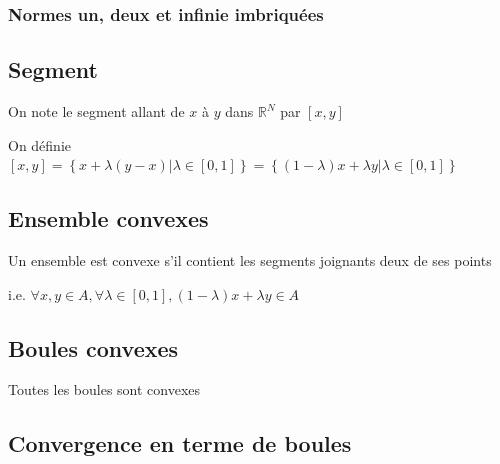 \documentclass[a4paper,10pt]{article}
\newcommand{\R}{\mathbb{R}}
\begin{document}
\subsubsection{Normes un, deux et infinie imbriquées}

\begin{figure}[h]
\end{figure}


\subsection{Segment}

On note le segment allant de $x$ à $y$ dans $\R^N$ par $\left[ x,y \right]$

On définie $\left[ x,y \right]=\left\lbrace x + \lambda(y-x) \vert \lambda \in \left[ 0,1 \right] \right\rbrace = \left\lbrace (1-\lambda) x + \lambda y \vert \lambda \in \left[ 0,1 \right] \right\rbrace$

\subsection{Ensemble convexes}

Un ensemble est convexe s'il contient les segments joignants deux de ses points

i.e. $\forall x,y \in A, \forall \lambda \in \left[ 0,1 \right], (1-\lambda) x + \lambda y \in A$

\subsection{Boules convexes}

Toutes les boules sont convexes

\subsection{Convergence en terme de boules}
\end{document}

